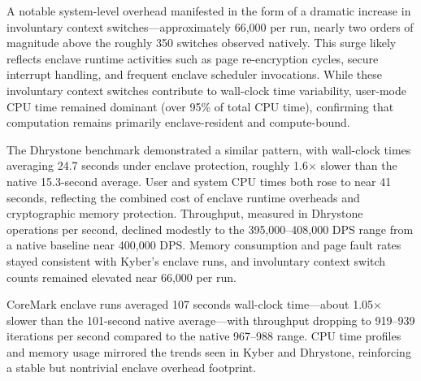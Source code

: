 
A notable system-level overhead manifested in the form of a dramatic increase in involuntary context switches—approximately 66,000 per run, nearly two orders of magnitude above the roughly 350 switches observed natively. This surge likely reflects enclave runtime activities such as page re-encryption cycles, secure interrupt handling, and frequent enclave scheduler invocations. While these involuntary context switches contribute to wall-clock time variability, user-mode CPU time remained dominant (over 95\% of total CPU time), confirming that computation remains primarily enclave-resident and compute-bound.


The Dhrystone benchmark demonstrated a similar pattern, with wall-clock times averaging 24.7 seconds under enclave protection, roughly 1.6$\times$ slower than the native 15.3-second average. User and system CPU times both rose to near 41 seconds, reflecting the combined cost of enclave runtime overheads and cryptographic memory protection. Throughput, measured in Dhrystone operations per second, declined modestly to the 395,000--408,000 DPS range from a native baseline near 400,000 DPS. Memory consumption and page fault rates stayed consistent with Kyber’s enclave runs, and involuntary context switch counts remained elevated near 66,000 per run.

CoreMark enclave runs averaged 107 seconds wall-clock time—about 1.05$\times$ slower than the 101-second native average—with throughput dropping to 919--939 iterations per second compared to the native 967--988 range. CPU time profiles and memory usage mirrored the trends seen in Kyber and Dhrystone, reinforcing a stable but nontrivial enclave overhead footprint.

